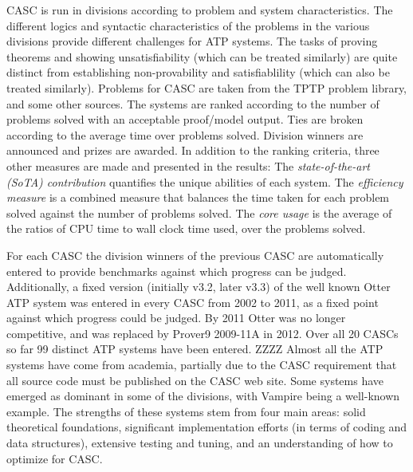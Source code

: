 \documentclass{easychair}
\begin{document}
CASC is run in divisions according to problem and system characteristics. 
The different logics and syntactic characteristics of the problems in the various divisions 
provide different challenges for ATP systems. 
The tasks of proving theorems and showing unsatisfiability (which can be treated similarly) are 
quite distinct from establishing non-provability and satisfiablility (which can also be treated 
similarly).
Problems for CASC are taken from the TPTP problem library, and some other sources. 
The systems are ranked according to the number of problems solved with an acceptable proof/model 
output.
Ties are broken according to the average time over problems solved.
Division winners are announced and prizes are awarded.
In addition to the ranking criteria, three other measures are made and
presented in the results:
The {\em state-of-the-art (SoTA) contribution} quantifies the unique
abilities of each system.
The {\em efficiency measure} is a combined measure that balances the time
taken for each problem solved against the number of problems solved.
The {\em core usage} is the average of the ratios of CPU time to
wall clock time used, over the problems solved.

For each CASC the division winners of the previous CASC are automatically
entered to provide benchmarks against which progress can be judged.
Additionally, a fixed version (initially v3.2, later v3.3) of the well known 
Otter ATP system was entered in every CASC from 2002 to 2011, as a fixed 
point against which progress could be judged.
By 2011 Otter was no longer competitive, and was replaced by Prover9 2009-11A
in 2012.
Over all 20 CASCs so far 99 distinct ATP systems have been entered.  ZZZZ
Almost all the ATP systems have come from academia, partially due to the
CASC requirement that all source code must be published on the CASC web site.
Some systems have emerged as dominant in some of the divisions, with Vampire being a well-known
example.
The strengths of these systems stem from four main areas:
solid theoretical foundations, significant implementation efforts (in terms of coding and data 
structures), extensive testing and tuning, and an understanding of how to optimize for CASC.
\end{document}
